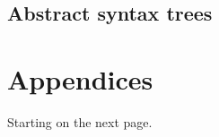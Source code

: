 \documentclass[a4paper,11pt]{article}
\begin{document}
\subsection{Abstract syntax trees}

\appendix
\section{Appendices}

Starting on the next page.




\end{document}
